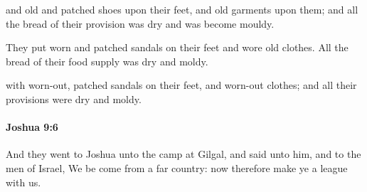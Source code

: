 			\begin{versebox}
					\item[BHS] 
					\item[ASV] and old and patched shoes upon their feet, and old garments upon them; and all the bread of their provision was dry and was become mouldy.
					\item[NIV] They put worn and patched sandals on their feet and wore old clothes. All the bread of their food supply was dry and moldy.
					\item[NRSV] with worn-out, patched sandals on their feet, and worn-out clothes; and all their provisions were dry and moldy.
			\end{versebox}

		\paragraph{Joshua 9:6} %
			\label{JOSHUA-9-6}

			And they went to Joshua unto the camp at Gilgal, and said unto him, and to the men of Israel, We be come from a far country: now therefore make ye a league with us.

